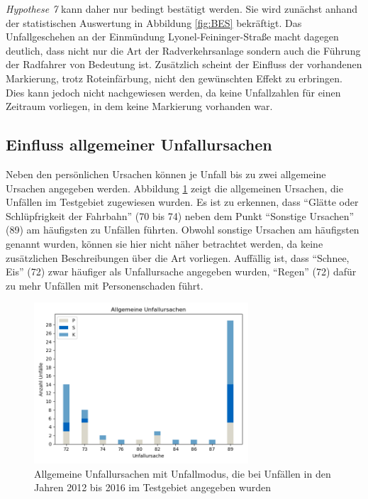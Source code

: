 \textit{Hypothese 7} kann daher nur bedingt bestätigt werden. Sie wird zunächst anhand der statistischen Auswertung in Abbildung \ref{fig:BES} bekräftigt. Das Unfallgeschehen an der Einmündung Lyonel-Feininger-Straße macht dagegen deutlich, dass nicht nur die Art der Radverkehrsanlage sondern auch die Führung der Radfahrer von Bedeutung ist. Zusätzlich scheint der Einfluss der vorhandenen Markierung, trotz Roteinfärbung, nicht den gewünschten Effekt zu erbringen. Dies kann jedoch nicht nachgewiesen werden, da keine Unfallzahlen für einen Zeitraum vorliegen, in dem keine Markierung vorhanden war. 


\subsection{Einfluss allgemeiner Unfallursachen}
Neben den persönlichen Ursachen können je Unfall bis zu zwei allgemeine Ursachen angegeben werden. Abbildung \ref{fig:allg_Ursachen} zeigt die allgemeinen Ursachen, die Unfällen im Testgebiet zugewiesen wurden. Es ist zu erkennen, dass \enquote{Glätte oder Schlüpfrigkeit der Fahrbahn} (70 bis 74) neben dem Punkt \enquote{Sonstige Ursachen} (89) am häufigsten zu Unfällen führten. Obwohl sonstige Ursachen am häufigsten genannt wurden, können sie hier nicht näher betrachtet werden, da keine zusätzlichen Beschreibungen über die Art vorliegen. Auffällig ist, dass \enquote{Schnee, Eis} (72) zwar häufiger als Unfallursache angegeben wurden, \enquote{Regen} (72) dafür zu mehr Unfällen mit Personenschaden führt. 

\begin{savenotes}
	\begin{figure}[H]
		\centering
		\includegraphics[width=8cm,height=6cm]{figures/allg_Ursachen}
		\caption[Allgemeine Unfallursachen mit Unfallmodus, die bei Unfällen in den Jahren 2012 bis 2016 im Testgebiet angegeben wurden]{Allgemeine Unfallursachen mit Unfallmodus, die bei Unfällen in den Jahren 2012 bis 2016 im Testgebiet angegeben wurden}\label{fig:allg_Ursachen}
	\end{figure}
\end{savenotes}

